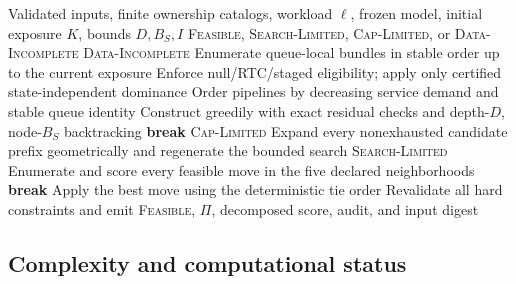\begin{algorithm}[t]
\caption{Deterministic topology-aware placement}
\label{alg:placement}
\begin{algorithmic}[1]
\Require Validated inputs, finite ownership catalogs, workload $\ell$, frozen model, initial exposure $K$, bounds $D,B_S,I$
\Ensure \textsc{Feasible}, \textsc{Search-Limited}, \textsc{Cap-Limited}, or \textsc{Data-Incomplete}
  \State \Return \textsc{Data-Incomplete}
\EndIf
{}
  \State Enumerate queue-local bundles in stable order up to the current exposure
  \State Enforce null/RTC/staged eligibility; apply only certified state-independent dominance
\EndFor
\State Order pipelines by decreasing service demand and stable queue identity
\Repeat
  \State Construct greedily with exact residual checks and depth-$D$, node-$B_S$ backtracking
   \State \textbf{break} \EndIf
    \State \Return \textsc{Cap-Limited}
  \EndIf
  \State Expand every nonexhausted candidate prefix geometrically and regenerate the bounded search
  \State \Return \textsc{Search-Limited}
\EndIf
{}
  \State Enumerate and score every feasible move in the five declared neighborhoods
   \State \textbf{break} \EndIf
  \State Apply the best move using the deterministic tie order
\EndFor
\State Revalidate all hard constraints and emit \textsc{Feasible}, $\Pi$, decomposed score, audit, and input digest
\end{algorithmic}
\end{algorithm}

\subsection{Complexity and computational status}

